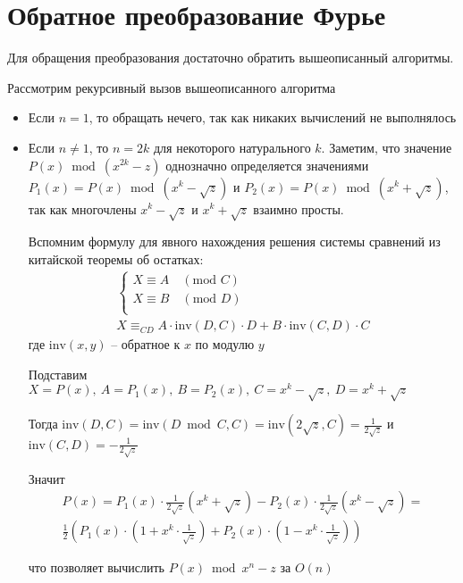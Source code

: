 \section{Обратное преобразование Фурье}


Для обращения преобразования достаточно обратить вышеописанный алгоритмы.


Рассмотрим рекурсивный вызов вышеописанного алгоритма
\begin{itemize}
    \item Если $n = 1$, то обращать нечего, так как никаких вычислений не выполнялось
    \item Если $n \neq 1$, то $n = 2k$ для некоторого натурального $k$. Заметим, что значение $P(x) \bmod (x^{2k} - z)$
          однозначно определяется значениями $P_1(x) = P(x) \bmod (x^k - \sqrt{z})$ и $P_2(x) = P(x) \bmod (x^k + \sqrt{z})$, так как многочлены $x^k - \sqrt{z}$ и $x^k + \sqrt{z}$ взаимно просты.

          Вспомним формулу для явного нахождения решения системы сравнений из китайской теоремы об остатках:
          \begin{gather}
              \begin{cases}
                  X \equiv A \quad (\text{mod } C) \\
                  X \equiv B \quad (\text{mod } D) \\
              \end{cases} \\
              X \equiv_{CD}
              A \cdot \text{inv}(D, C) \cdot D +
              B \cdot \text{inv}(C, D) \cdot C
          \end{gather}
          где $\text{inv}(x, y)$ -- обратное к $x$ по модулю $y$

          Подставим $X = P(x),\ A = P_1(x),\ B = P_2(x),\ C = x^k - \sqrt{z},\ D = x^k + \sqrt{z}$

          Тогда $\text{inv}(D, C) = \text{inv}(D \bmod C, C) = \text{inv}(2\sqrt{z}, C) = \frac{1}{2\sqrt{z}}$ и $\text{inv}(C, D) = -\frac{1}{2\sqrt{z}}$

          Значит
          \begin{gather}
              P(x) =
              P_1(x) \cdot \frac{1}{2\sqrt{z}} \left(x^k + \sqrt{z} \right) -
              P_2(x) \cdot \frac{1}{2\sqrt{z}} \left(x^k - \sqrt{z} \right) =
              \\
              \frac{1}{2} \left(
              P_1(x) \cdot  \left(1 + x^k \cdot \frac{1}{\sqrt{z}} \right) +
              P_2(x) \cdot  \left(1 - x^k \cdot \frac{1}{\sqrt{z}} \right)
              \right)
          \end{gather}

          что позволяет вычислить $P(x) \bmod x^n - z$ за $O(n)$
\end{itemize}
